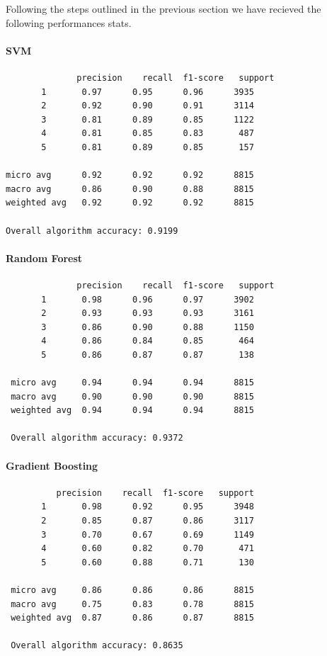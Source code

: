 Following the steps outlined in the previous section we have recieved
the following performances stats.

\hypertarget{svm}{%
\paragraph{SVM}\label{svm}}

\begin{verbatim}
              precision    recall  f1-score   support
       1       0.97      0.95      0.96      3935
       2       0.92      0.90      0.91      3114
       3       0.81      0.89      0.85      1122
       4       0.81      0.85      0.83       487
       5       0.81      0.89      0.85       157
       
micro avg      0.92      0.92      0.92      8815
macro avg      0.86      0.90      0.88      8815
weighted avg   0.92      0.92      0.92      8815

Overall algorithm accuracy: 0.9199
\end{verbatim}

\hypertarget{random-forest}{%
\paragraph{Random Forest}\label{random-forest}}

\begin{verbatim}
              precision    recall  f1-score   support
       1       0.98      0.96      0.97      3902
       2       0.93      0.93      0.93      3161
       3       0.86      0.90      0.88      1150
       4       0.86      0.84      0.85       464
       5       0.86      0.87      0.87       138
       
 micro avg     0.94      0.94      0.94      8815
 macro avg     0.90      0.90      0.90      8815
 weighted avg  0.94      0.94      0.94      8815
 
 Overall algorithm accuracy: 0.9372
\end{verbatim}

\hypertarget{gradient-boosting}{%
\paragraph{Gradient Boosting}\label{gradient-boosting}}

\begin{verbatim}
          precision    recall  f1-score   support
       1       0.98      0.92      0.95      3948
       2       0.85      0.87      0.86      3117
       3       0.70      0.67      0.69      1149
       4       0.60      0.82      0.70       471
       5       0.60      0.88      0.71       130
       
 micro avg     0.86      0.86      0.86      8815
 macro avg     0.75      0.83      0.78      8815
 weighted avg  0.87      0.86      0.87      8815
 
 Overall algorithm accuracy: 0.8635
\end{verbatim}

